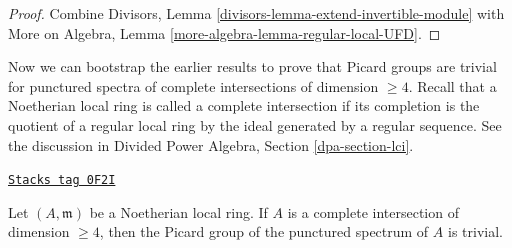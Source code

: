 \begin{proof}
Combine Divisors, Lemma \ref{divisors-lemma-extend-invertible-module}
with More on Algebra, Lemma \ref{more-algebra-lemma-regular-local-UFD}.
\end{proof}

Now we can bootstrap the earlier results to prove that
Picard groups are trivial for punctured spectra
of complete intersections of dimension $\geq 4$.
Recall that a Noetherian local ring is called a complete
intersection if its completion is the quotient of a
regular local ring by the ideal generated by a regular sequence.
See the discussion in Divided Power Algebra, Section \ref{dpa-section-lci}.

\begin{proposition}[Grothendieck]

\label{algebraization-proposition-trivial-local-pic-complete-intersection}
\href{https://stacks.math.columbia.edu/tag/0F2I}{\texttt{Stacks tag 0F2I}}

Let $(A, \mathfrak m)$ be a Noetherian local ring. If $A$ is a
complete intersection of dimension $\geq 4$, then the Picard
group of the punctured spectrum of $A$ is trivial.
\end{proposition}

